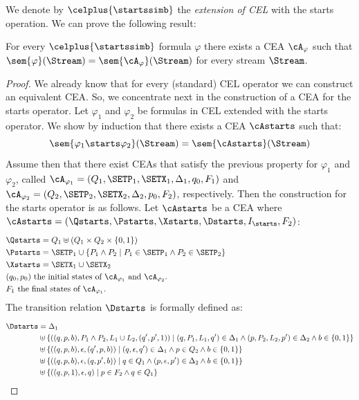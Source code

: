 We denote by $\celplus{\startssimb}$ the \emph{extension of CEL} with the starts operation. We can prove the following result:

\begin{theorem} \label{theo:mytheorem}
	For every $\celplus{\startssimb}$ formula $\varphi$ there exists a CEA $\cA_\varphi$ such that $\sem{\varphi}(\Stream) = \sem{\cA_\varphi}(\Stream)$ for every stream $\Stream$.
\end{theorem}


\begin{proof}
	We already know that for every (standard) CEL operator we can construct an equivalent CEA. So, we concentrate next in the construction of a CEA for the starts operator. 
	Let $\varphi_1$ and $\varphi_2$ be formulas in CEL extended with the starts operator. We show by induction that there exists a CEA $\cAstarts$ such that:
	\[
	\sem{\varphi_1 \starts \varphi_2}(\Stream) = \sem{\cAstarts}(\Stream)
	\]
	Assume then that there exist CEAs that satisfy the previous property for $\varphi_1$ and $\varphi_2$, called $\cA_{\varphi_1} = (Q_1, \SETP_1, \SETX_1, \Delta_1, q_0, F_1)$ and $\cA_{\varphi_2} = (Q_2, \SETP_2, \SETX_2, \Delta_2, p_0, F_2)$, respectively. 
	Then the construction for the starts operator is as follows.
	Let $\cAstarts$ be a CEA where $\cAstarts = (\Qstarts, \Pstarts, \Xstarts, \Dstarts, I_{\starts}, F_2)$:
	\[
	\begin{aligned}[t]
		& \Qstarts = Q_1 \uplus (Q_1 \times Q_2 \times \{0, 1\}) \\
		& \Pstarts = \SETP_1 \cup \{ P_1 \land P_2 \mid P_1 \in \SETP_1 \land P_2 \in \SETP_2 \} \hspace*{155px}\\
		& \Xstarts  = \SETX_1 \cup \SETX_2 \\
		& (q_0,p_0) \text{ the initial states of }\cA_{\varphi_1} \text{ and } \cA_{\varphi_2}.\\
		& F_1 \text{ the final states of } \cA_{\varphi_1}.
	\end{aligned}
	\]
	The transition relation $\Dstarts$ is formally defined as:
	\[
	\begin{aligned}[t]
		\Dstarts & = \Delta_1\\
		& \uplus \{((q, p, b), P_1 \land P_2, L_1 \cup L_2, (q', p', 1)) \mid (q, P_1, L_1, q') \in \Delta_1 \land (p, P_2, L_2, p') \in \Delta_2 \land b \in \{0, 1\}\} \\
		& \uplus \{((q, p, b), \epsilon, (q', p, b)) \mid (q, \epsilon, q') \in \Delta_1 \land p \in Q_2 \land b \in \{0, 1\}\}  \\
		& \uplus \{((q, p, b), \epsilon, (q, p', b)) \mid q \in Q_1 \land (p, \epsilon, p') \in \Delta_2 \land b \in \{0, 1\}\}  \\
		& \uplus \{((q, p, 1), \epsilon, q) \mid p \in F_2 \land q \in Q_1\}
	\end{aligned}
	\]
	

\end{proof}
